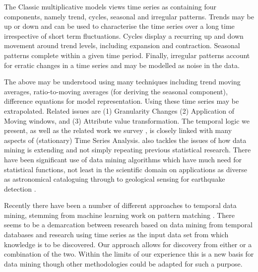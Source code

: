 The Classic multiplicative models views time series as containing four
components, namely trend, cycles, seasonal and irregular patterns.
Trends may be up or down and can be used to characterise the time
series over a long time irrespective of short term fluctuations.
Cycles display a recurring up and down movement around trend levels,
including expansion and contraction. Seasonal patterns complete within
a given time period. Finally, irregular patterns account for erratic
changes in a time series and may be modelled as noise in the data.
\smallskip

The above may be understood using many techniques including trend moving averages, ratio-to-moving averages (for deriving
the seasonal component), difference equations for model
representation. Using these time series may be extrapolated.
Related issues are (1) Granularity Changes (2) Application of Moving
windows, and (3) Attribute value transformation. The temporal logic we
present, as well as the related work we survey
\cite{frm94,lai93,alss95,dgm97,dlm98}, is closely linked with many
aspects of (stationary) Time Series Analysis. \cite{gmp97} also
tackles the issues of how data mining is extending and not simply
repeating previous statistical research. There have been significant
use of data mining algorithms which have much need for statistical
functions, not least in the scientific domain on applications as
diverse as astronomical cataloguing through to geological sensing for
earthquake detection \cite{fhs96}.

\medskip

Recently there have been a number of different approaches to temporal
data mining, stemming from machine learning work on pattern
matching \cite{lai93,alss95}. There seems to be a demarcation between research based on
data mining from temporal databases and research using time series as
the input data set from which knowledge is to be discovered. Our
approach allows for discovery from either or a combination of the
two. Within the limits of our experience this is a new basis for data
mining though other methodologies could be
adapted for such a purpose.

\medskip

